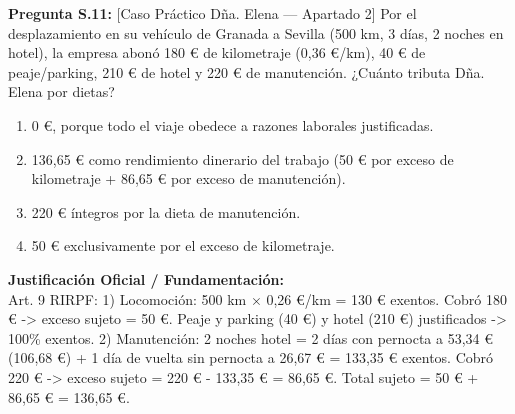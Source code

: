 \documentclass[11pt,a4paper,openany]{article}
\begin{document}
\vspace{0.3cm}

\noindent\textbf{\sffamily Pregunta S.11:} [Caso Práctico Dña. Elena — Apartado 2] Por el desplazamiento en su vehículo de Granada a Sevilla (500 km, 3 días, 2 noches en hotel), la empresa abonó 180 \euro{} de kilometraje (0,36 \euro{}/km), 40 \euro{} de peaje/parking, 210 \euro{} de hotel y 220 \euro{} de manutención. ¿Cuánto tributa Dña. Elena por dietas?\\[0.15cm]
\begin{enumerate}[label=\textbf{\alph*)},leftmargin=1.8em,itemsep=1.5pt,topsep=2pt,partopsep=0pt,parsep=0pt]
    \item 0 \euro{}, porque todo el viaje obedece a razones laborales justificadas.
    \item 136,65 \euro{} como rendimiento dinerario del trabajo (50 \euro{} por exceso de kilometraje + 86,65 \euro{} por exceso de manutención).
    \item 220 \euro{} íntegros por la dieta de manutención.
    \item 50 \euro{} exclusivamente por el exceso de kilometraje.
\end{enumerate}
\begin{solucionBox}
\textbf{Justificación Oficial / Fundamentación:}\\[0.1cm]
Art. 9 RIRPF: 1) Locomoción: 500 km $\times$  0,26 \euro{}/km = 130 \euro{} exentos. Cobró 180 \euro{} -> exceso sujeto = 50 \euro{}. Peaje y parking (40 \euro{}) y hotel (210 \euro{}) justificados -> 100\% exentos. 2) Manutención: 2 noches hotel = 2 días con pernocta a 53,34 \euro{} (106,68 \euro{}) + 1 día de vuelta sin pernocta a 26,67 \euro{} = 133,35 \euro{} exentos. Cobró 220 \euro{} -> exceso sujeto = 220 \euro{} - 133,35 \euro{} = 86,65 \euro{}. Total sujeto = 50 \euro{} + 86,65 \euro{} = 136,65 \euro{}.
\end{solucionBox}
\vspace{0.35cm}
\end{document}
